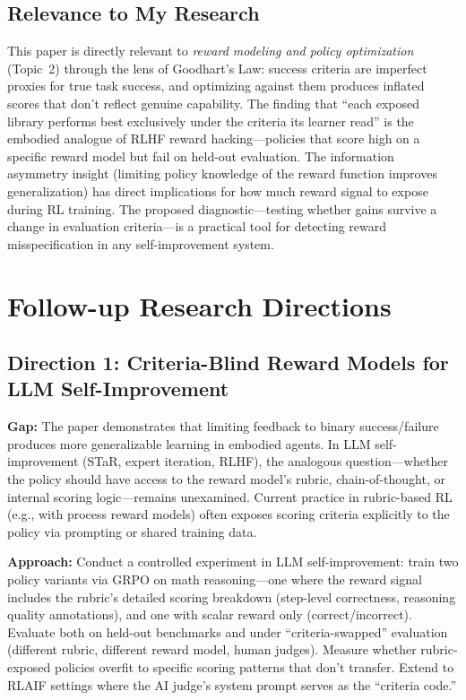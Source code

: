 \documentclass[11pt,a4paper]{article}
\begin{document}
\subsection{Relevance to My Research}
This paper is directly relevant to \emph{reward modeling and policy optimization} (Topic~2) through the lens of Goodhart's Law: success criteria are imperfect proxies for true task success, and optimizing against them produces inflated scores that don't reflect genuine capability. The finding that ``each exposed library performs best exclusively under the criteria its learner read'' is the embodied analogue of RLHF reward hacking---policies that score high on a specific reward model but fail on held-out evaluation. The information asymmetry insight (limiting policy knowledge of the reward function improves generalization) has direct implications for how much reward signal to expose during RL training. The proposed diagnostic---testing whether gains survive a change in evaluation criteria---is a practical tool for detecting reward misspecification in any self-improvement system.

\section{Follow-up Research Directions}

\subsection{Direction 1: Criteria-Blind Reward Models for LLM Self-Improvement}
\textbf{Gap:} The paper demonstrates that limiting feedback to binary success/failure produces more generalizable learning in embodied agents. In LLM self-improvement (STaR, expert iteration, RLHF), the analogous question---whether the policy should have access to the reward model's rubric, chain-of-thought, or internal scoring logic---remains unexamined. Current practice in rubric-based RL (e.g., with process reward models) often exposes scoring criteria explicitly to the policy via prompting or shared training data.

\textbf{Approach:} Conduct a controlled experiment in LLM self-improvement: train two policy variants via GRPO on math reasoning---one where the reward signal includes the rubric's detailed scoring breakdown (step-level correctness, reasoning quality annotations), and one with scalar reward only (correct/incorrect). Evaluate both on held-out benchmarks and under ``criteria-swapped'' evaluation (different rubric, different reward model, human judges). Measure whether rubric-exposed policies overfit to specific scoring patterns that don't transfer. Extend to RLAIF settings where the AI judge's system prompt serves as the ``criteria code.''
\end{document}

